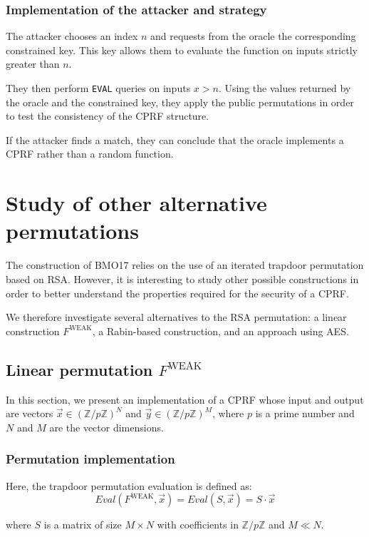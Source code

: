 \documentclass[9pt]{extarticle}
\begin{document}
\subsubsection{Implementation of the attacker and strategy}

The attacker chooses an index $n$ and requests from the oracle the corresponding constrained
key. This key allows them to evaluate the function on inputs
strictly greater than $n$.

They then perform \texttt{EVAL} queries on inputs
$x > n$. Using the values returned by the oracle and the constrained key, they
apply the public permutations in order to test the consistency of the CPRF structure.

If the attacker finds a match, they can conclude that the oracle implements a CPRF rather than a random function.




\section{Study of other alternative permutations}

The construction of BMO17 relies on the use of an iterated trapdoor permutation based on RSA. 
However, it is interesting to study other possible constructions in order 
to better understand the properties required for the security of a CPRF.

We therefore investigate several alternatives to the RSA permutation: 
a linear construction \(F^{\text{WEAK}}\), a Rabin-based construction, 
and an approach using AES.

\subsection{Linear permutation $F^{\text{WEAK}}$}

In this section, we present an implementation of a CPRF whose input and output are vectors
$\vec{x} \in (\mathbb{Z}/p\mathbb{Z})^N$ and $\vec{y} \in (\mathbb{Z}/p\mathbb{Z})^M$,
where $p$ is a prime number and $N$ and $M$ are the vector dimensions.

\subsubsection{Permutation implementation}
Here, the trapdoor permutation evaluation is defined as:
\[Eval(F^{\text{WEAK}},\vec{x}) = Eval(S,\vec{x}) = S \cdot \vec{x}\]

where $S$ is a matrix of size $M \times N$ with coefficients in $\mathbb{Z}/p\mathbb{Z}$
and $M \ll N$.
\end{document}
